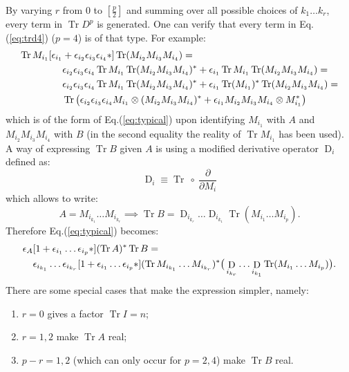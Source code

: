 \documentclass[12pt,a4paper]{article}
\DeclareMathOperator{\Tr}{Tr}
\DeclareMathOperator{\D}{D}
\begin{document}
By varying $r$ from $0$ to $\left[\frac{p}{2}\right]$ and summing over all possible choices of $k_1 \ldots k_r$, every term in $\Tr D^p$ is generated.\newline
One can verify that every term in Eq.(\ref{eq:trd4}) ($p=4$) is of that type. For example:
\begin{align}
\Tr M_{i_1} [\epsilon_{i_1} &+ \epsilon_{i_2} \epsilon_{i_3} \epsilon_{i_4} *] \Tr ( M_{i_2} M_{i_3} M_{i_4}) = \notag \\
&\epsilon_{i_2} \epsilon_{i_3} \epsilon_{i_4} \Tr M_{i_1} \Tr (M_{i_2} M_{i_3} M_{i_4})^* + \epsilon_{i_1} \Tr M_{i_1} \Tr ( M_{i_2} M_{i_3} M_{i_4}) = \notag \\
&\epsilon_{i_2} \epsilon_{i_3} \epsilon_{i_4} \Tr M_{i_1} \Tr (M_{i_2} M_{i_3} M_{i_4})^* + \epsilon_{i_1} \Tr (M_{i_1})^* \Tr ( M_{i_2} M_{i_3} M_{i_4}) = \notag \\
&\Tr \big( \epsilon_{i_2} \epsilon_{i_3} \epsilon_{i_4}  M_{i_1} \otimes (M_{i_2} M_{i_3} M_{i_4})^* + \epsilon_{i_1}  M_{i_2} M_{i_3} M_{i_4} \otimes M_{i_1}^*  \big)
\end{align}
which is of the form of Eq.(\ref{eq:typical}) upon identifying $M_{i_1}$ with $A$ and $M_{i_2} M_{i_3} M_{i_4}$ with $B$ (in the second equality the reality of $\Tr M_{i_1}$ has been used). \newline
A way of expressing $\Tr B$ given $A$ is using a modified derivative operator $\D_i$ defined as:
\begin{equation}
\D_i \equiv \Tr \ \circ \ \frac{\partial}{\partial M_i} 
\end{equation}
which allows to write:
\begin{equation}
A = M_{i_{k_1}} \ldots M_{i_{k_r}} \implies \Tr B = \D_{i_{k_r}} \ldots \D_{i_{k_1}} \Tr (M_{i_1} \ldots M_{i_p}).
\end{equation}
Therefore Eq.(\ref{eq:typical}) becomes:
\begin{align}
\epsilon_A&[1+ \epsilon_{i_1} \ldots \epsilon_{i_p} *] (\Tr A)^* \Tr B = \notag \\
&\epsilon_{i_{k_1}} \ldots \epsilon_{i_{k_r}}[1 + \epsilon_{i_1} \ldots \epsilon_{i_p} * ] (\Tr M_{i_{k_1}} \ldots M_{i_{k_r}})^* \big( \D_{i_{k_r}} \ldots \D_{i_{k_1}} \Tr (M_{i_1} \ldots M_{i_p}) \big).
\end{align}
There are some special cases that make the expression simpler, namely:
\begin{enumerate}
\item $r=0$ gives a factor $\Tr I = n$;
\item $r=1, 2$ make $\Tr A$ real;
\item $p-r=1, 2$ (which can only occur for $p=2, 4$) make $\Tr B$ real. 
\end{enumerate}
\end{document}
